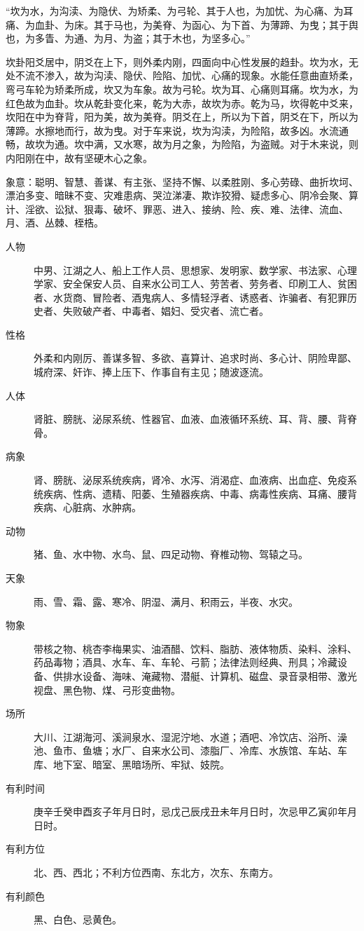 \documentclass[12pt,oneside]{book}
\begin{document}
“坎为水，为沟渎、为隐伏、为矫柔、为弓轮、其于人也，为加忧、为心痛、为耳痛、为血卦、为床。其于马也，为美脊、为函心、为下首、为薄蹄、为曳；其于舆也，为多眚、为通、为月、为盗；其于木也，为坚多心。”

坎卦阳爻居中，阴爻在上下，则外柔内刚，四面向中心性发展的趋卦。坎为水，无处不流不渗入，故为沟渎、隐伏、险陷、加忧、心痛的现象。水能任意曲直矫柔，弯弓车轮为矫柔所成，坎又为车象。故为弓轮。坎为耳、心痛则耳痛。坎为水，为红色故为血卦。坎从乾卦变化来，乾为大赤，故坎为赤。乾为马，坎得乾中爻来，坎阳在中为脊背，阳为美，故为美脊。阴爻在上，所以为下首，阴爻在下，所以为薄蹄。水擦地而行，故为曳。对于车来说，坎为沟渎，为险陷，故多凶。水流通畅，故坎为通。坎中满，又水寒，故为月之象，为险陷，为盗贼。对于木来说，则内阳刚在中，故有坚硬木心之象。

象意：聪明、智慧、善谋、有主张、坚持不懈、以柔胜刚、多心劳碌、曲折坎坷、漂泊多变、暗昧不变、灾难患病、哭泣涕凄、欺诈狡猾、疑虑多心、阴冷会聚、算计、淫欲、讼狱、狠毒、破坏、罪恶、进入、接纳、险、疾、难、法律、流血、月、酒、丛棘、桎梏。


\begin{description}
\item[人物] 中男、江湖之人、船上工作人员、思想家、发明家、数学家、书法家、心理学家、安全保安人员、自来水公司工人、劳苦者、劳务者、印刷工人、贫困者、水货商、冒险者、酒鬼病人、多情轻浮者、诱惑者、诈骗者、有犯罪历史者、失败破产者、中毒者、娼妇、受灾者、流亡者。
\item[性格] 外柔和内刚厉、善谋多智、多欲、喜算计、追求时尚、多心计、阴险卑鄙、城府深、奸诈、捧上压下、作事自有主见；随波逐流。
\item[人体] 肾脏、膀胱、泌尿系统、性器官、血液、血液循环系统、耳、背、腰、背脊骨。
\item[病象] 肾、膀胱、泌尿系统疾病，肾冷、水泻、消渴症、血液病、出血症、免疫系统疾病、性病、遗精、阳萎、生殖器疾病、中毒、病毒性疾病、耳痛、腰背疾病、心脏病、水肿病。
\item[动物] 猪、鱼、水中物、水鸟、鼠、四足动物、脊椎动物、驾辕之马。
\item[天象] 雨、雪、霜、露、寒冷、阴湿、满月、积雨云，半夜、水灾。
\item[物象] 带核之物、桃杏李梅果实、油酒醋、饮料、脂肪、液体物质、染料、涂料、药品毒物；酒具、水车、车、车轮、弓箭；法律法则经典、刑具；冷藏设备、供排水设备、海味、淹藏物、潜艇、计算机、磁盘、录音录相带、激光视盘、黑色物、煤、弓形变曲物。
\item[场所] 大川、江湖海河、溪涧泉水、湿泥泞地、水道；酒吧、冷饮店、浴所、澡池、鱼市、鱼塘；水厂、自来水公司、漆脂厂、冷库、水族馆、车站、车库、地下室、暗室、黑暗场所、牢狱、妓院。
\item[有利时间] 庚辛壬癸申酉亥子年月日时，忌戊己辰戌丑未年月日时，次忌甲乙寅卯年月日时。
\item[有利方位] 北、西、西北；不利方位西南、东北方，次东、东南方。
\item[有利颜色] 黑、白色、忌黄色。
\end{description}
\end{document}
